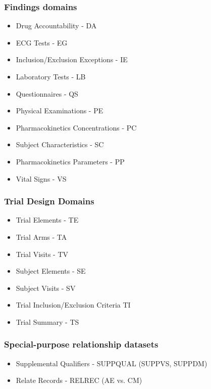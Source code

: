 \documentclass{beamer}
\begin{document}
\begin{frame}
  \frametitle{Findings domains}
  \begin{itemize}
	\item Drug Accountability - DA 
	\item ECG Tests - EG 
	\item Inclusion/Exclusion Exceptions - IE 
	\item Laboratory Tests - LB 
	\item Questionnaires - QS 
	\item Physical Examinations - PE 
	\item Pharmacokinetics Concentrations - PC 
	\item Subject Characteristics - SC 
	\item Pharmacokinetics Parameters - PP 
	\item Vital Signs - VS 
  \end{itemize}
\end{frame}

\begin{frame}
  \frametitle{Trial Design Domains}
  \begin{itemize}
	\item Trial Elements - TE 
	\item Trial Arms - TA 
	\item Trial Visits - TV 
	\item Subject Elements - SE 
	\item Subject Visits - SV 
	\item Trial Inclusion/Exclusion Criteria  TI 
	\item Trial Summary - TS 
  \end{itemize}
\end{frame}

\begin{frame}
  \frametitle{Special-purpose relationship datasets}
  \begin{itemize}
	\item Supplemental Qualifiers - SUPPQUAL (SUPPVS, SUPPDM)
	\item Relate Records - RELREC (AE vs. CM)
  \end{itemize}
\end{frame}
\end{document}
